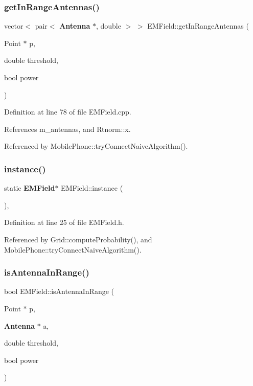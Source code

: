 \mbox{\label{class_e_m_field_a929d0adcb4e69d088209644665a15644}} 
\subsubsection{getInRangeAntennas()}
{\footnotesize\ttfamily vector$<$ pair$<$ \textbf{ Antenna} $\ast$, double $>$ $>$ E\+M\+Field\+::get\+In\+Range\+Antennas (\begin{DoxyParamCaption}\item[{Point $\ast$}]{p,  }\item[{double}]{threshold,  }\item[{bool}]{power }\end{DoxyParamCaption})}



Definition at line 78 of file E\+M\+Field.\+cpp.



References m\+\_\+antennas, and Rtnorm\+::x.



Referenced by Mobile\+Phone\+::try\+Connect\+Naive\+Algorithm().

\mbox{\label{class_e_m_field_acbadbede116ac320398cbfcd19e90ec7}} 
\subsubsection{instance()}
{\footnotesize\ttfamily static \textbf{ E\+M\+Field}$\ast$ E\+M\+Field\+::instance (\begin{DoxyParamCaption}{ }\end{DoxyParamCaption})\hspace{0.3cm}{\ttfamily [inline]}, {\ttfamily [static]}}



Definition at line 25 of file E\+M\+Field.\+h.



Referenced by Grid\+::compute\+Probability(), and Mobile\+Phone\+::try\+Connect\+Naive\+Algorithm().

\mbox{\label{class_e_m_field_a724a0875311def27abe0e7ec7932ca41}} 
\subsubsection{isAntennaInRange()}
{\footnotesize\ttfamily bool E\+M\+Field\+::is\+Antenna\+In\+Range (\begin{DoxyParamCaption}\item[{Point $\ast$}]{p,  }\item[{\textbf{ Antenna} $\ast$}]{a,  }\item[{double}]{threshold,  }\item[{bool}]{power }\end{DoxyParamCaption})}



